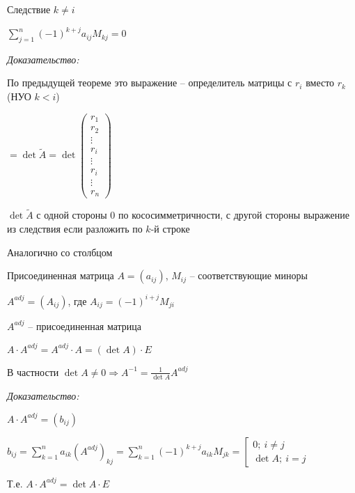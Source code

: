 \documentclass[12pt]{article}
\begin{document}
\begin{theo}{Следствие}
    $k \neq i$

    $\sum\limits_{j = 1}^n (-1)^{k + j} a_{ij} M_{kj} = 0$
\end{theo}

\textit{Доказательство:}

По предыдущей теореме это выражение -- определитель матрицы с $r_i$ вместо $r_k$ (НУО $k < i$)

$= \det \tilde{A} = \det \begin{pmatrix}
    r_1 \\
    r_2 \\
    \vdots \\
    r_i  \\
    \vdots \\
    r_i \\
    \vdots \\
    r_n
\end{pmatrix}$

$\det \tilde{A}$ с одной стороны 0 по кососимметричности, с другой стороны выражение из следствия если разложить по $k$-й строке

\begin{Remark}{}
    Аналогично со столбцом
\end{Remark}

\begin{defin}{Присоединенная матрица}
    $A = (a_{ij})$, $M_{ij}$ -- соответствующие миноры

    $A^{adj} = (A_{ij})$, где $A_{ij} = (-1)^{i + j} M_{ji}$

    $A^{adj}$ -- присоединенная матрица
\end{defin}

\begin{theo}{}
    $A \cdot A^{adj} = A^{adj} \cdot A = (\det A) \cdot E$

    В частности $\det A \neq 0 \Rightarrow A^{-1} = \frac{1}{\det A} A^{adj}$
\end{theo}

\textit{Доказательство:}

$A \cdot A^{adj} = (b_{ij})$

$b_{ij} = \sum\limits_{k = 1}^n a_{ik} (A^{adj})_{kj} = \sum\limits_{k = 1}^n (-1)^{k + j} a_{ik} M_{jk} = \left[ \begin{gathered}
    0;\ i \neq j \\
    \det A;\ i = j
\end{gathered} \right.$

Т.е. $A \cdot A^{adj} = \det A \cdot E$
\end{document}
